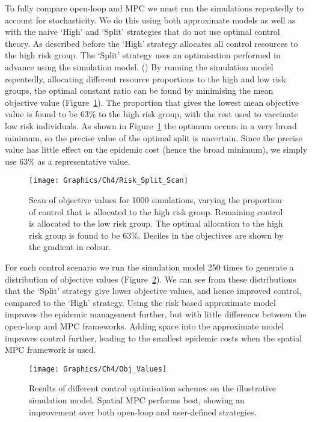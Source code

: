 To fully compare open-loop and MPC we must run the simulations repeatedly to account for stochasticity. We do this using both approximate models as well as with the naive `High' and `Split' strategies that do not use optimal control theory. As described before the `High' strategy allocates all control resources to the high risk group. The `Split' strategy uses an optimisation performed in advance using the simulation model. () By running the simulation model repeatedly, allocating different resource proportions to the high and low risk groups, the optimal constant ratio can be found by minimising the mean objective value (Figure~\ref{fig:ch4:risk_split_scan}). The proportion that gives the lowest mean objective value is found to be 63\% to the high risk group, with the rest used to vaccinate low risk individuals. As shown in Figure~\ref{fig:ch4:risk_split_scan} the optimum occurs in a very broad minimum, so the precise value of the optimal split is uncertain. Since the precise value has little effect on the epidemic cost (hence the broad minimum), we simply use 63\% as a representative value.

\begin{figure}[h]
    \begin{center}
        \texttt{[image: Graphics/Ch4/Risk\_Split\_Scan]}
        \caption{Scan of objective values for 1000 simulations, varying the proportion of control that is allocated to the high risk group. Remaining control is allocated to the low risk group. The optimal allocation to the high risk group is found to be 63\%. Deciles in the objectives are shown by the gradient in colour.}
        \label{fig:ch4:risk_split_scan}
    \end{center}
\end{figure}

For each control scenario we run the simulation model 250 times to generate a distribution of objective values (Figure~\ref{fig:ch4:obj_values}). We can see from these distributions that the `Split' strategy give lower objective values, and hence improved control, compared to the `High' strategy. Using the risk based approximate model improves the epidemic management further, but with little difference between the open-loop and MPC frameworks. Adding space into the approximate model improves control further, leading to the smallest epidemic costs when the spatial MPC framework is used.

\begin{figure}[h]
    \begin{center}
        \texttt{[image: Graphics/Ch4/Obj\_Values]}
        \caption{Results of different control optimisation schemes on the illustrative simulation model. Spatial MPC performs best, showing an improvement over both open-loop and user-defined strategies.}
        \label{fig:ch4:obj_values}
    \end{center}
\end{figure}


